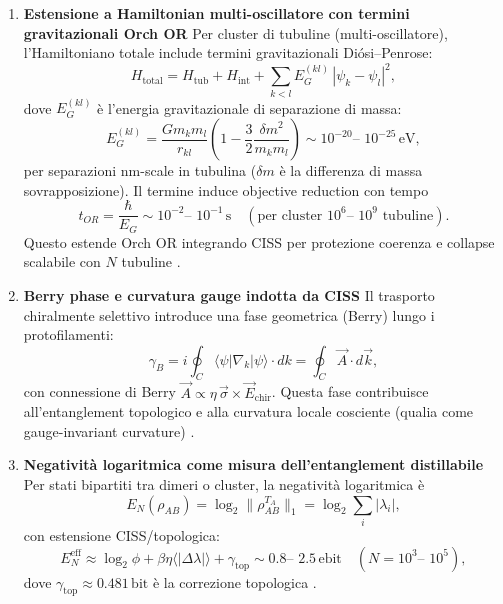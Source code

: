 \documentclass[11pt,a4paper]{article}
\let\oldcite\cite
\renewcommand{\cite}{\protect\oldcite}
\theoremstyle{plain}
\theoremstyle{definition}
\begin{document}
\begin{enumerate}
    \item \textbf{Estensione a Hamiltonian multi-oscillatore con termini gravitazionali Orch OR}  
    Per cluster di tubuline (multi-oscillatore), l'Hamiltoniano totale include termini gravitazionali Diósi–Penrose:
    \begin{equation}
    H_{\mathrm{total}} = H_{\mathrm{tub}} + H_{\mathrm{int}} + \sum_{k<l} E_G^{(kl)} \, |\psi_k - \psi_l|^2,
    \label{eq:ham_multi_grav}
    \end{equation}
    dove $E_G^{(kl)}$ è l'energia gravitazionale di separazione di massa:
    \begin{equation}
    E_G^{(kl)} = \frac{G m_k m_l}{r_{kl}} \left(1 - \frac{3}{2} \frac{\delta m^2}{m_k m_l}\right) \sim 10^{-20} \text{-- } 10^{-25}\,\mathrm{eV},
    \label{eq:grav_self_energy}
    \end{equation}
    per separazioni nm-scale in tubulina ($\delta m$ è la differenza di massa sovrapposizione). Il termine induce objective reduction con tempo
    \begin{equation}
    t_{OR} = \frac{\hbar}{E_G} \sim 10^{-2} \text{-- } 10^{-1} \, \mathrm{s} \quad (\text{per cluster } 10^6 \text{-- } 10^9 \text{ tubuline}).
    \label{eq:or_time}
    \end{equation}
    Questo estende Orch OR integrando CISS per protezione coerenza e collapse scalabile con $N$ tubuline \cite{hameroff2014consciousness, penrose1994shadows, mavromatos2025microtubules}.

    \item \textbf{Berry phase e curvatura gauge indotta da CISS}  
    Il trasporto chiralmente selettivo introduce una fase geometrica (Berry) lungo i protofilamenti:
    \begin{equation}
    \gamma_B = i \oint_C \langle \psi | \nabla_k | \psi \rangle \cdot dk = \oint_C \vec{A} \cdot d\vec{k},
    \label{eq:berry_phase_ciss}
    \end{equation}
    con connessione di Berry $\vec{A} \propto \eta \, \vec{\sigma} \times \vec{E}_{\mathrm{chir}}$. Questa fase contribuisce all'entanglement topologico e alla curvatura locale cosciente (qualia come gauge-invariant curvature) \cite{naaman2020spin, sala2026spin}.

    \item \textbf{Negatività logaritmica come misura dell'entanglement distillabile}  
    Per stati bipartiti tra dimeri o cluster, la negatività logaritmica è
    \begin{equation}
    E_N(\rho_{AB}) = \log_2 \bigl\| \rho_{AB}^{T_A} \bigr\|_1 = \log_2 \sum_i |\lambda_i|,
    \label{eq:log_negativity_tubulin}
    \end{equation}
    con estensione CISS/topologica:
    \begin{equation}
    E_N^{\mathrm{eff}} \approx \log_2 \phi + \beta \eta \langle |\Delta \lambda| \rangle + \gamma_{\mathrm{top}} \sim 0.8 \text{-- } 2.5 \, \mathrm{ebit} \quad (N = 10^3 \text{-- } 10^5),
    \label{eq:log_neg_eff}
    \end{equation}
    dove $\gamma_{\mathrm{top}} \approx 0.481\,\mathrm{bit}$ è la correzione topologica \cite{chen2025universal, planat2025fibonacci}.


\end{enumerate}
\end{document}
